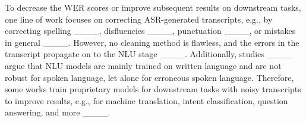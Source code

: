 To decrease the WER scores or improve subsequent results on downstream tasks, one line of work focuses on correcting ASR-generated transcripts, e.g., by correcting spelling ____, disfluencies ____, punctuation ____, or mistakes in general ____.
However, no cleaning method is flawless, and the errors in the transcript propagate on to the NLU stage ____. 
Additionally, studies ____ argue that NLU models are mainly trained on written language and are not robust for spoken language, let alone for erroneous spoken language.
Therefore, some works train proprietary models for downstream tasks with noisy transcripts to improve results, e.g., for machine translation, intent classification, question answering, and more ____.

